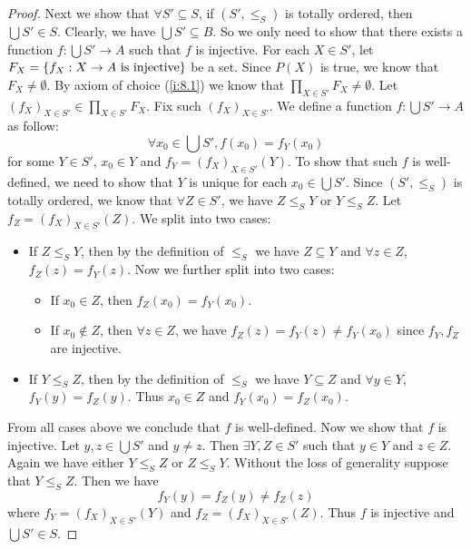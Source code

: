 \begin{proof}
  Next we show that \(\forall S' \subseteq S\), if \((S', \leq_S)\) is totally ordered, then \(\bigcup S' \in S\).
  Clearly, we have \(\bigcup S' \subseteq B\).
  So we only need to show that there exists a function \(f : \bigcup S' \to A\) such that \(f\) is injective.
  For each \(X \in S'\), let \(F_X = \left\lbrace f_X : X \to A \text{ is injective}\right\rbrace\) be a set.
  Since \(P(X)\) is true, we know that \(F_X \neq \emptyset\).
  By axiom of choice (\cref{i:8.1}) we know that \(\prod_{X \in S'} F_X \neq \emptyset\).
  Let \((f_X)_{X \in S'} \in \prod_{X \in S'} F_X\).
  Fix such \((f_X)_{X \in S'}\).
  We define a function \(f : \bigcup S' \to A\) as follow:
  \[
    \forall x_0 \in \bigcup S', f(x_0) = f_Y(x_0)
  \]
  for some \(Y \in S'\), \(x_0 \in Y\) and \(f_Y = (f_X)_{X \in S'}(Y)\).
  To show that such \(f\) is well-defined, we need to show that \(Y\) is unique for each \(x_0 \in \bigcup S'\).
  Since \((S', \leq_S)\) is totally ordered, we know that \(\forall Z \in S'\), we have \(Z \leq_S Y\) or \(Y \leq_S Z\).
  Let \(f_Z = (f_X)_{X \in S'}(Z)\).
  We split into two cases:
  \begin{itemize}
    \item If \(Z \leq_S Y\), then by the definition of \(\leq_S\) we have \(Z \subseteq Y\) and \(\forall z \in Z\), \(f_Z(z) = f_Y(z)\).
          Now we further split into two cases:
          \begin{itemize}
            \item If \(x_0 \in Z\), then \(f_Z(x_0) = f_Y(x_0)\).
            \item If \(x_0 \notin Z\), then \(\forall z \in Z\), we have \(f_Z(z) = f_Y(z) \neq f_Y(x_0)\) since \(f_Y, f_Z\) are injective.
          \end{itemize}
    \item If \(Y \leq_S Z\), then by the definition of \(\leq_S\) we have \(Y \subseteq Z\) and \(\forall y \in Y\), \(f_Y(y) = f_Z(y)\).
          Thus \(x_0 \in Z\) and \(f_Y(x_0) = f_Z(x_0)\).
  \end{itemize}
  From all cases above we conclude that \(f\) is well-defined.
  Now we show that \(f\) is injective.
  Let \(y, z \in \bigcup S'\) and \(y \neq z\).
  Then \(\exists Y, Z \in S'\) such that \(y \in Y\) and \(z \in Z\).
  Again we have either \(Y \leq_S Z\) or \(Z \leq_S Y\).
  Without the loss of generality suppose that \(Y \leq_S Z\).
  Then we have
  \[
    f_Y(y) = f_Z(y) \neq f_Z(z)
  \]
  where \(f_Y = (f_X)_{X \in S'}(Y)\) and \(f_Z = (f_X)_{X \in S'}(Z)\).
  Thus \(f\) is injective and \(\bigcup S' \in S\).


\end{proof}
